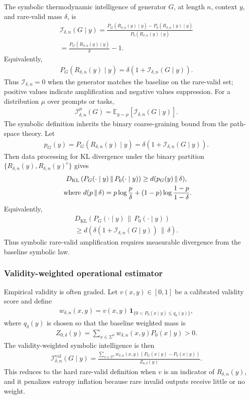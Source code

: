 \documentclass[
  aps,
  prresearch,
  reprint,
  amsmath,
  amssymb,
  superscriptaddress,
  nofootinbib,
  longbibliography
]{revtex4-2}
\def\EQSP{3pt}
\newcommand{\mltlne}[2][\EQSP]{\begingroup\setlength\abovedisplayskip{#1}\setlength\belowdisplayskip{#1}\begin{equation}\begin{multlined} #2 \end{multlined}\end{equation}\endgroup\noindent}
\newcommand{\cgather}[2][\EQSP]{\begingroup\setlength\abovedisplayskip{#1}\setlength\belowdisplayskip{#1}\begin{gather} #2 \end{gather}\endgroup\noindent}
\newcommand{\Exp}{\mathbb{E}}
\newcommand{\calI}{\mathcal{I}}
\begin{document}
The symbolic thermodynamic intelligence of generator \(G\), at length \(n\), context \(y\), and rare-valid mass \(\delta\), is
\mltlne{
    \calI_{\delta,n}(G\mid y)
    =
    \frac{
    P_G(R_{\delta,n}(y)\mid y)
    -
    P_0(R_{\delta,n}(y)\mid y)
    }
    {
    P_0(R_{\delta,n}(y)\mid y)
    }
   \\ =
    \frac{P_G(R_{\delta,n}(y)\mid y)}{\delta}-1.
    \label{eq:sym_I}
}
Equivalently,
\cgather{
    P_G(R_{\delta,n}(y)\mid y)
    =
    \delta\left(1+\calI_{\delta,n}(G\mid y)\right).
    \label{eq:sym_mass_lift}
}
Thus \(\calI_{\delta,n}=0\) when the generator matches the baseline on the rare-valid set; positive values indicate amplification and negative values suppression. For a distribution \(\mu\) over prompts or tasks,
\cgather{
    \calI_{\delta,n}^{\mu}(G)
    =
    \Exp_{y\sim\mu}
    \left[
    \calI_{\delta,n}(G\mid y)
    \right].
    \label{eq:sym_population_I}
}
The symbolic definition inherits the binary coarse-graining bound from the path-space theory. Let
\cgather{
    p_G(y)
    =
    P_G(R_{\delta,n}(y)\mid y)
    =
    \delta\left(1+\calI_{\delta,n}(G\mid y)\right).
}
Then data processing for KL divergence under the binary partition \(\{R_{\delta,n}(y),R_{\delta,n}(y)^c\}\) gives
\cgather{
    D_{\mathrm{KL}}
    \left(
    P_G(\cdot\mid y)\,\|\,P_0(\cdot\mid y)
    \right)
    \geq
    d(p_G(y)\,\|\,\delta),
    \label{eq:sym_binary_kl}\\
    \text{ where } d(p\,\|\,\delta)
    =
    p\log\frac{p}{\delta}
    +
    (1-p)\log\frac{1-p}{1-\delta}\notag.
}
Equivalently,
\mltlne{
    D_{\mathrm{KL}}
    \left(
    P_G(\cdot\mid y)\,\|\,P_0(\cdot\mid y)
    \right)
    \\\geq
    d\left(
    \delta(1+\calI_{\delta,n}(G\mid y))
    \,\|\,\delta
    \right).
    \label{eq:sym_kl_I}
}
Thus symbolic rare-valid amplification requires measurable divergence from the baseline symbolic law.

\subsubsection{Validity-weighted operational estimator}

Empirical validity is often graded. Let \(v(x,y)\in[0,1]\) be a calibrated validity score and define
\cgather{
    w_{\delta,n}(x,y)
    =
    v(x,y)\,
    \mathbf{1}_{\{0<P_0(x\mid y)\leq q_{\delta}(y)\}},
}
where \(q_{\delta}(y)\) is chosen so that the baseline weighted mass is
\cgather{
    Z_{0,\delta}(y)
    =
    \sum_{x\in\Sigma^n}
    w_{\delta,n}(x,y)P_0(x\mid y)
    >
    0.
}
The validity-weighted symbolic intelligence is then
\cgather{
    \calI_{\delta,n}^{\mathrm{val}}(G\mid y)
    =
    \frac{
    \sum_{x\in\Sigma^n}
    w_{\delta,n}(x,y)
    \left(P_G(x\mid y)-P_0(x\mid y)\right)
    }
    {Z_{0,\delta}(y)}.
    \label{eq:sym_valid_weighted}
}
This reduces to the hard rare-valid definition when \(v\) is an indicator of \(R_{\delta,n}(y)\), and it penalizes entropy inflation because rare invalid outputs receive little or no weight.
\end{document}
